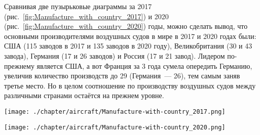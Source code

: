 Сравнивая две пузырьковые диаграммы за 2017 (рис.~\ref{fig:Manufacture_with_country_2017}) и 2020 (рис.~\ref{fig:Manufacture_with_country_2020}) годы, можно сделать вывод, что основными производителями воздушных судов в мире 
в 2017 и 2020 годах были: США (115 заводов в 2017 и 135 заводов в 2020 году), Великобритания (30 и 43 завода), Германия (17 и 26 заводов) и Россия (17 и 21 завод). Лидером по-прежнему является США, 
а вот Франция за 3 года сумела опередить Германию, 
увеличив количество производств до 29 (Германия~--- 26), 
тем самым заняв третье место. 
Но в целом соотношение по производству воздушных судов между различными странами остаётся на прежнем уровне.



\begin{fullwidth}
\noindent\begin{minipage}[]{.46\linewidth}
    \centering
	    \texttt{[image: ./chapter/aircraft/Manufacture-with-country\_2017.png]}
	    \label{fig:Manufacture_with_country_2017}
\end{minipage}%
\hfill
\begin{minipage}[]{.46\linewidth}
    \centering
	\texttt{[image: ./chapter/aircraft/Manufacture-with-country\_2020.png]}
	\label{fig:Manufacture_with_country_2020}
\end{minipage}
\end{fullwidth}%











